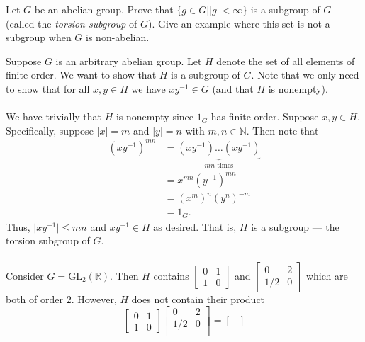 \documentclass[12 pt, letterpaper]{hmcpset}
\begin{document}
\begin{problem}
	Let $G$ be an abelian group. Prove that $\{ g \in G | \lvert g \rvert < \infty \}$ is a subgroup of $G$ (called the \textit{torsion subgroup} of $G$). Give an example where this set is not a subgroup when $G$ is non-abelian.
\end{problem}

\begin{solution} 
	Suppose $G$ is an arbitrary abelian group. Let $H$ denote the set of all elements of finite order. We want to show that $H$ is a subgroup of $G$. Note that we only need to show that for all $x, y \in H$ we have $xy^{-1} \in G$ (and that $H$ is nonempty). \\\\
	We have trivially that $H$ is nonempty since $1_G$ has finite order. Suppose $x, y \in H$. Specifically, suppose $\lvert x \rvert = m$ and $\lvert y \rvert = n$ with $m, n \in \mathbb{N}$. Then note that
	\[
		\begin{split}
			(xy^{-1})^{mn} & = \underbrace{(xy^{-1}) \dots (xy^{-1})}_{mn \text{ times}} \\
				       & = x^{mn} (y^{-1})^{mn} \\
				       & = (x^{m})^n (y^n)^{-m} \\
				       & = 1_G.
		\end{split}
	\]
	Thus, $\lvert xy^{-1} \rvert \le mn$ and $xy^{-1} \in H$ as desired. That is, $H$ is a subgroup --- the torsion subgroup of $G$. \\\\
	Consider $G = \mathrm{GL}_2(\mathbb{R})$. Then $H$ contains $\begin{bmatrix}
			0 & 1 \\
			1 & 0
		\end{bmatrix}$ and $\begin{bmatrix}
			0 & 2 \\
			1/2 & 0
		\end{bmatrix}$ which are both of order $2$. However, $H$ does not contain their product
		\[
			\begin{bmatrix}
				0 & 1 \\
				1 & 0
			\end{bmatrix}
			\begin{bmatrix}
				0 & 2 \\
				1/2 & 0 \\
			\end{bmatrix} = 
			\begin{bmatrix}

\end{bmatrix}\]
\end{solution}
\end{document}
